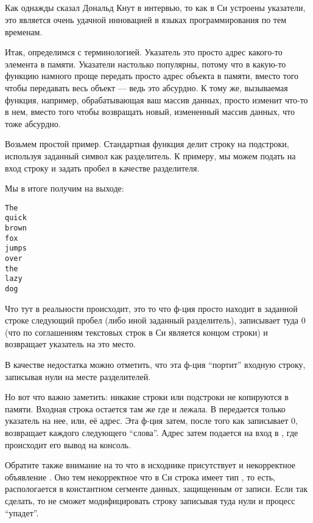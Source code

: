 ﻿\subsection{}

Как однажды сказал Дональд Кнут в интервью\cite{KnuthInterview1993}, то как в Си устроены указатели, это является
очень удачной инновацией в языках программирования по тем временам.

Итак, определимся с терминологией. Указатель это просто адрес какого-то элемента в памяти. Указатели настолько
популярны, потому что в какую-то функцию намного проще передать просто адрес объекта в памяти, вместо того
чтобы передавать весь объект --- ведь это абсурдно. К тому же, вызываемая функция, например, обрабатывающая
ваш массив данных, просто изменит что-то в нем, вместо того чтобы возвращать новый, измененный массив данных, 
что тоже абсурдно.

Возьмем простой пример. Стандартная функция  делит строку на подстроки, используя заданный символ
как разделитель. К примеру, мы можем подать на вход строку  
и задать пробел в качестве разделителя.



Мы в итоге получим на выходе:

\begin{lstlisting}
The
quick
brown
fox
jumps
over
the
lazy
dog
\end{lstlisting}

Что тут в реальности происходит, это то что ф-ция  просто находит в заданной строке следующий пробел 
(либо иной заданный разделитель),
записывает туда $0$ (что по соглашениям текстовых строк в Си является концом строки) и возвращает указатель на это
место.

В качестве недостатка  можно отметить, что эта ф-ция ``портит'' входную строку, записывая нули
на месте разделителей.

Но вот что важно заметить: никакие строки или подстроки не копируются в памяти. Входная
строка остается там же где и лежала. В  передается только указатель на нее, или, её адрес.
Эта ф-ция затем, после
того как записывает $0$, возвращает  каждого следующего ``слова''.
Адрес затем подается на вход в , где происходит его вывод на консоль.

Обратите также внимание на то что в исходнике присутствует и некорректное объявление . Оно тем некорректное
что в Си строка имеет тип , то есть, распологается в константном сегменте данных, защищенным
от записи.
Если так сделать, то  не сможет модифицировать строку записывая туда нули и процесс ``упадет''.

